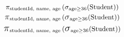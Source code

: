 \documentclass{article}
\newcommand\ppi{{\mathlarger{\pi}}} %
\newcommand\pppi{{\mathlarger{\ppi}}}
\newcommand\ssigma{{\mathlarger{\sigma}}} %
\newcommand\sssigma{{\mathlarger{\ssigma}}}
\begin{document}
\begin{gather*}
\pi_{\textup{studentId, name, age}} \left(\sigma_{\textup{age}\geq36} (\textup{Student})\right)\\
\ppi_{\textup{studentId, name, age}} \left(\ssigma_{\textup{age}\geq36} (\textup{Student})\right)\\
\pppi_{\textup{studentId, name, age}} \left(\sssigma_{\textup{age}\geq36} (\textup{Student})\right)
\end{gather*}
\end{document}
